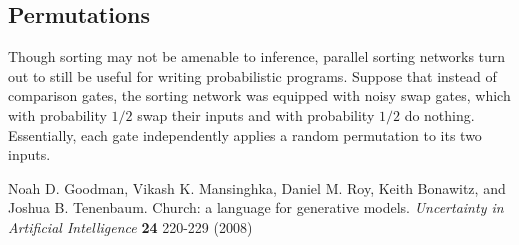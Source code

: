 \documentclass[11pt]{article}
\begin{document}
\subsection{Permutations}

Though sorting may not be amenable to inference, parallel sorting networks turn out to still be useful for writing probabilistic programs. Suppose that instead of comparison gates, the sorting network was equipped with noisy swap gates, which with probability $1/2$ swap their inputs and with probability $1/2$ do nothing. Essentially, each gate independently applies a random permutation to its two inputs.

\begin{thebibliography}{9}
    Noah D. Goodman, Vikash K. Mansinghka, Daniel M. Roy, Keith Bonawitz, and Joshua B. Tenenbaum. Church: a language for generative models. \emph{Uncertainty in Artificial Intelligence} \textbf{24} 220-229 (2008)
\end{thebibliography}
\end{document}
